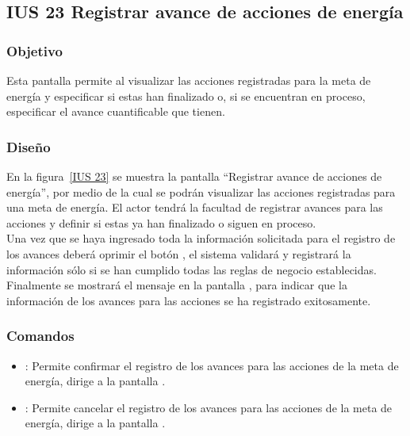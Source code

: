\subsection{IUS 23 Registrar avance de acciones de energía}

\subsubsection{Objetivo}

    Esta pantalla permite al  visualizar las acciones registradas para la meta de energía y especificar si estas han finalizado o, si se encuentran en proceso, especificar el avance cuantificable que tienen.
    
\subsubsection{Diseño}

        En la figura~\ref{IUS 23} se muestra la pantalla ``Registrar avance de acciones de energía'', por medio de la cual se podrán visualizar las acciones registradas para una meta de energía. El actor tendrá la facultad de registrar avances para las acciones y definir si estas ya han finalizado o siguen en proceso.\\
        
        Una vez que se haya ingresado toda la información solicitada para el registro de los avances deberá oprimir el botón , el sistema validará y registrará la información sólo si se han cumplido todas las reglas de negocio establecidas.\\
    
      Finalmente se mostrará el mensaje  en la pantalla , para indicar que la información de los avances para las acciones se ha registrado exitosamente.
        


\subsubsection{Comandos}
    \begin{itemize}	
	\item {}: Permite confirmar el registro de los avances para las acciones de la meta de energía, dirige a la pantalla .
	\item {}: Permite cancelar el registro de los avances para las acciones de la meta de energía, dirige a la pantalla .
    \end{itemize}

